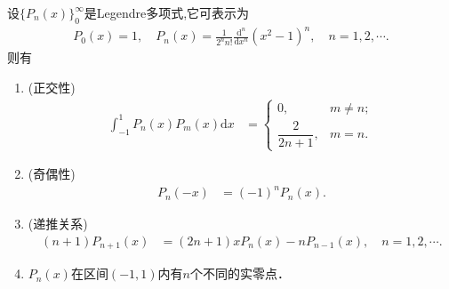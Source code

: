 \documentclass[../../main.tex]{subfiles}%
\begin{document}
\begin{theorem}[Legendre多项式的性质]\label{theorem:Legendre多项式的性质}
设$\{P_n(x)\}_0^{\infty}$是Legendre多项式,它可表示为
\begin{align*}
P_0(x) = 1,\quad P_n(x) = \frac{1}{2^n n!} \frac{\mathrm{d}^n}{\mathrm{d}x^n}(x^2 - 1)^n,\quad n = 1,2,\cdots.
\end{align*}
则有
\begin{enumerate}
\item (正交性)
\begin{align}\label{eq:数值分析-3-2.7}
\int_{-1}^1 P_n(x)P_m(x)\mathrm{d}x &=
\begin{cases}
0, & m \neq n; \\
\dfrac{2}{2n+1}, & m = n.
\end{cases}
\end{align}

\item (奇偶性)
\begin{align}\label{eq:数值分析-3-2.8}
P_n(-x) &= (-1)^n P_n(x).
\end{align}

\item (递推关系)
\begin{align}\label{eq:数值分析-3-2.9}
(n+1)P_{n+1}(x) &= (2n+1)xP_n(x) - nP_{n-1}(x),\quad n = 1,2,\cdots.
\end{align}

\item $P_n(x)$在区间$(-1,1)$内有$n$个不同的实零点．
\end{enumerate}
\end{theorem}
\end{document}
